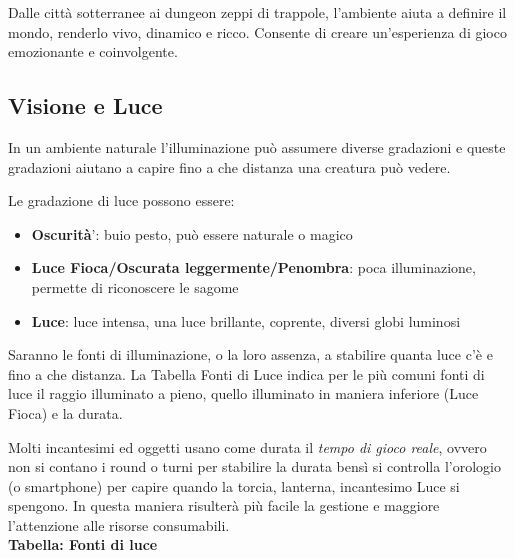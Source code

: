 \documentclass[12pt,a4paper,twoside,openany]{book}
\begin{document}
\begin{multicols}{2}
	
Dalle città sotterranee ai dungeon zeppi di trappole, l'ambiente aiuta a definire il mondo, renderlo vivo, dinamico e ricco. Consente di creare un'esperienza di gioco emozionante e coinvolgente.
	
\label{regole-ambientali}

\subsection{Visione e Luce}

\label{sec:visione-e-luce}

In un ambiente naturale l'illuminazione può assumere diverse gradazioni e queste gradazioni aiutano a capire fino a che distanza una creatura può vedere.

Le gradazione di luce possono essere:
\begin{itemize}
\item
\textbf{Oscurità}': buio pesto, può essere naturale o magico
\item
\textbf{Luce Fioca/Oscurata leggermente/Penombra}: poca illuminazione, permette di riconoscere le sagome
\item
\textbf{Luce}: luce intensa, una luce brillante, coprente, diversi globi luminosi
\end{itemize}

Saranno le fonti di illuminazione, o la loro assenza, a stabilire quanta luce c'è e fino a che distanza. La Tabella Fonti di Luce indica per le più comuni fonti di luce il raggio illuminato a pieno, quello illuminato in maniera inferiore (Luce Fioca) e la durata.

Molti incantesimi ed oggetti usano come durata il \textit{tempo di gioco reale}, ovvero non si contano i round o turni per stabilire la durata bensì si controlla l'orologio (o smartphone) per capire quando la torcia, lanterna, incantesimo Luce si spengono. In questa maniera risulterà più facile la gestione e maggiore l'attenzione alle risorse consumabili.\\

\textbf{Tabella: Fonti di luce}

\medskip



\end{multicols}
\end{document}
